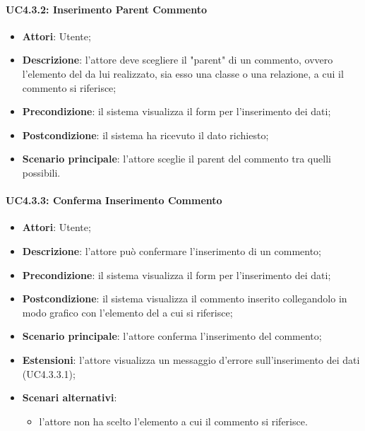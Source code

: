 \paragraph{UC4.3.2: Inserimento Parent Commento}
\label{UC4.3.2}
\begin{itemize}
\item \textbf{Attori}: Utente;
\item \textbf{Descrizione}: l'attore deve scegliere il "parent" di un commento, ovvero l'elemento del  da lui realizzato, sia esso una classe o una relazione, a cui il commento si riferisce;
\item \textbf{Precondizione}: il sistema visualizza il form per l'inserimento dei dati;	
\item \textbf{Postcondizione}: il sistema ha ricevuto il dato richiesto;	
\item \textbf{Scenario principale}:
l'attore sceglie il parent del commento tra quelli possibili.
\end{itemize}

\paragraph{UC4.3.3: Conferma Inserimento Commento}
\label{UC4.3.3}
\begin{itemize}
\item \textbf{Attori}: Utente;
\item \textbf{Descrizione}: l'attore può confermare l'inserimento di un commento;	
\item \textbf{Precondizione}: il sistema visualizza il form per l'inserimento dei dati;	
\item \textbf{Postcondizione}: il sistema visualizza il commento inserito collegandolo in modo grafico con l'elemento del  a cui si riferisce;	
\item \textbf{Scenario principale}:
l'attore conferma l'inserimento del commento;	
\item \textbf{Estensioni}:
l'attore visualizza un messaggio d'errore sull'inserimento dei dati (UC4.3.3.1);	
\item \textbf{Scenari alternativi}:
\begin{itemize}
\item l'attore non ha scelto l'elemento a cui il commento si riferisce.
\end{itemize}
\end{itemize}

